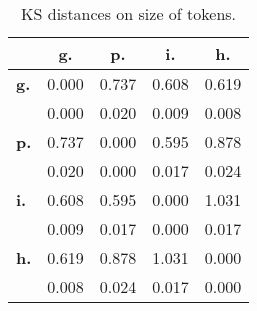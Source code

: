 \begin{table}[h!]
\begin{center}
\begin{tabular}{| l || c | c | c | c |}\hline
 & {\bf g.} & {\bf p.} & {\bf i.} & {\bf h.} \\\hline\hline
{\bf g.} & 0.000 & 0.737 & 0.608 & 0.619 \\
{\bf } & 0.000 & 0.020 & 0.009 & 0.008 \\\hline
{\bf p.} & 0.737 & 0.000 & 0.595 & 0.878 \\
{\bf } & 0.020 & 0.000 & 0.017 & 0.024 \\\hline
{\bf i.} & 0.608 & 0.595 & 0.000 & 1.031 \\
{\bf } & 0.009 & 0.017 & 0.000 & 0.017 \\\hline
{\bf h.} & 0.619 & 0.878 & 1.031 & 0.000 \\
{\bf } & 0.008 & 0.024 & 0.017 & 0.000 \\\hline
\end{tabular}
\caption{KS distances on size of tokens.}
\end{center}
\end{table}